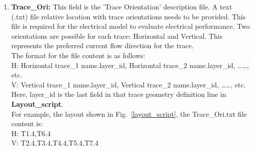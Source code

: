 \documentclass[11pt]{article}
\begin{document}
\begin{enumerate}
    \item \textbf{Trace\_Ori:}
    This field is the 'Trace Orientation' description file. A text (.txt) file relative location with trace orientations needs to be provided. This file is required for the electrical model to evaluate electrical performance. Two orientations are possible for each trace: Horizontal and Vertical. This represents the preferred current flow direction for the trace.\\
    The format for the file content is as follows:\\
    H: Horizontal trace\_1 name.layer\_id, Horizontal trace\_2 name.layer\_id, ……, etc.\\
    V: Vertical trace\_1 name.layer\_id, Vertical trace\_2 name.layer\_id, ……, etc.\\
    Here, layer\_id is the last field in that trace geometry definition line in \textbf{Layout\_script}.\\
    For example, the layout shown in Fig.~\ref{layout_script}, the Trace\_Ori.txt file content is:\\
    H: T1.4,T6.4\\
    V: T2.4,T3.4,T4.4,T5.4,T7.4\\
    
\end{enumerate}
\end{document}

